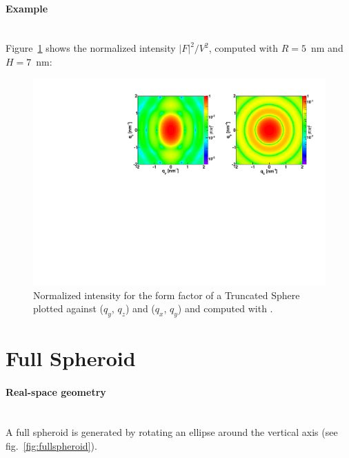 \paragraph{Example}\mbox{}\\
Figure~\ref{fig:SphereEx} shows the normalized intensity $|F|^2/V^2$, computed with $R=5$~nm and $H=7$~nm:
\begin{figure}[h]
\begin{center}
\includegraphics[width=\textwidth]{Figures/figffsphere}
\end{center}
\caption{Normalized intensity for the form factor of a Truncated Sphere plotted against ($q_y$, $q_z$) and ($q_x$, $q_y$) and
  computed with .}
\label{fig:SphereEx}
\end{figure}



\newpage%
\section{Full Spheroid}   

\paragraph{Real-space geometry}\mbox{}\\
A full spheroid is generated by rotating an ellipse around the vertical
axis (see fig.~\ref{fig:fullspheroid}).

